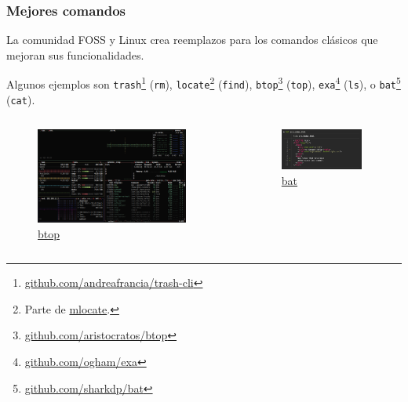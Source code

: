 \documentclass[aspectratio=43]{beamer}
\begin{document}
\begin{frame}
    \frametitle{Mejores comandos}
    La comunidad FOSS y Linux crea reemplazos para los comandos clásicos que mejoran sus funcionalidades.\newline

    Algunos ejemplos son \texttt{trash}\footnote{\href{https://github.com/andreafrancia/trash-cli}{github.com/andreafrancia/trash-cli}} (\texttt{rm}), \texttt{locate}\footnote{Parte de \href{https://pagure.io/mlocate}{mlocate}.} (\texttt{find}), \texttt{btop}\footnote{\href{https://github.com/aristocratos/btop}{github.com/aristocratos/btop}} (\texttt{top}), \texttt{exa}\footnote{\href{https://github.com/ogham/exa}{github.com/ogham/exa}} (\texttt{ls}), o \texttt{bat}\footnote{\href{https://github.com/sharkdp/bat}{github.com/sharkdp/bat}} (\texttt{cat}).

    \begin{columns}[c]
        \begin{column}{0.4\textwidth}
            \begin{figure}
                \centering
                \includegraphics[width=0.9\textwidth]{img/btop.png}
                \caption{\href{https://github.com/aristocratos/btop}{btop}}
            \end{figure}
        \end{column}
        \begin{column}{0.4\textwidth}
            \begin{figure}
                \centering
                \includegraphics[width=0.9\textwidth]{img/bat.png}
                \caption{\href{https://github.com/sharkdp/bat}{bat}}
            \end{figure}
        \end{column}
    \end{columns}
\end{frame}
\end{document}
